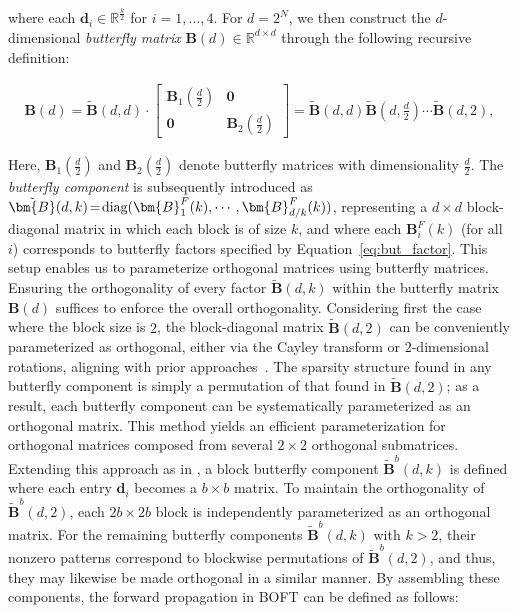 where each $\bm{d}_i\in\mathbb{R}^{\frac{k}{2}}$ for $i=1,\ldots,4$. For $d=2^N$, we then construct the $d$-dimensional \emph{butterfly matrix} $\bm{B}(d)\in\mathbb{R}^{d\times d}$ through the following recursive definition:

\begin{equation}
\begin{aligned}
    \!\!\bm{B}(d)=\tilde{\bm{B}}(d,d)\!\cdot\!\begin{bmatrix}
    \bm{B}_1(\frac{d}{2})\!\!\!\!\! & \bm{0} \\
    \bm{0}\!\!\!\!\! &\bm{B}_2(\frac{d}{2})
    \end{bmatrix}= \tilde{\bm{B}}(d,d)\tilde{\bm{B}}(d,\frac{d}{2})\cdots\tilde{\bm{B}}(d,2),
\end{aligned}
\end{equation}

Here, $\bm{B}_1(\frac{d}{2})$ and $\bm{B}_2(\frac{d}{2})$ denote butterfly matrices with dimensionality $\frac{d}{2}$. The \emph{butterfly component} is subsequently introduced as $\thickmuskip=2mu \medmuskip=2mu \tilde{\bm{B}}(d,k)=\text{diag}(\bm{B}^F_1(k),\cdots,\bm{B}^F_{d/k}(k))$, representing a $d\times d$ block-diagonal matrix in which each block is of size $k$, and where each $\bm{B}^F_i(k)$ (for all $i$) corresponds to butterfly factors specified by Equation~\ref{eq:but_factor}. This setup enables us to parameterize orthogonal matrices using butterfly matrices. Ensuring the orthogonality of every factor $\tilde{\bm{B}}(d,k)$ within the butterfly matrix $\bm{B}(d)$ suffices to enforce the overall orthogonality. Considering first the case where the block size is $2$, the block-diagonal matrix $\tilde{\bm{B}}(d,2)$ can be conveniently parameterized as orthogonal, either via the Cayley transform or $2$-dimensional rotations, aligning with prior approaches~\cite{liu2021orthogonal,qiu2023controlling}. The sparsity structure found in any butterfly component is simply a permutation of that found in $\tilde{\bm{B}}(d,2)$; as a result, each butterfly component can be systematically parameterized as an orthogonal matrix. This method yields an efficient parameterization for orthogonal matrices composed from several $2\times2$ orthogonal submatrices. Extending this approach as in \cite{chen2022pixelated}, a block butterfly component $\tilde{\bm{B}}^b(d,k)$ is defined where each entry $\bm{d}_i$ becomes a $b\times b$ matrix. To maintain the orthogonality of $\tilde{\bm{B}}^b(d,2)$, each $2b\times2b$ block is independently parameterized as an orthogonal matrix. For the remaining butterfly components $\tilde{\bm{B}}^b(d,k)$ with $k>2$, their nonzero patterns correspond to blockwise permutations of $\tilde{\bm{B}}^b(d,2)$, and thus, they may likewise be made orthogonal in a similar manner. By assembling these components, the forward propagation in BOFT can be defined as follows:

